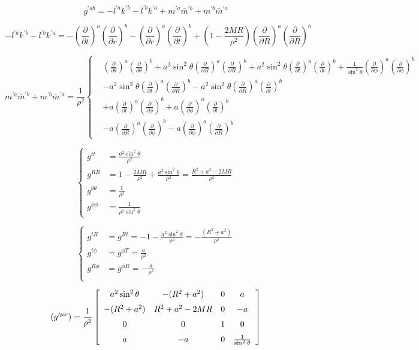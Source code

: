\documentclass{article}
\newcommand{\be}{\begin{equation}}
\newcommand{\ee}{\end{equation}}
\newcommand{\ba}{\begin{array}}
\newcommand{\ea}{\end{array}}
\newcommand{\p}{\partial}
\newcommand{\1}{\left}
\newcommand{\2}{\right}
\begin{document}
\be
g^{\prime ab}=-l^{\prime a}k^{\prime b}-l^{\prime b}k^{\prime a}+m^{\prime a}{\bar m}^{\prime b}+m^{\prime b}{\bar m}^{\prime a}
\ee

\newpage

\be 
-l^{\prime a}k^{\prime b}-l^{\prime b}k^{\prime a}
=-\1(\frac \p {\p t}\2)^a\1(\frac \p {\p r}\2)^b-\1(\frac \p {\p r}\2)^a\1(\frac \p {\p t}\2)^b+\1(1-\frac{2MR}{\rho^2}\2)\1(\frac \p {\p R}\2)^a\1(\frac \p {\p R}\2)^b
\ee

\be 
m^{\prime a}{\bar m}^{\prime b}+m^{\prime b}{\bar m}^{\prime a}=\frac{1}{\rho^2}
\1\{
\begin{split}
& \1(\frac \p {\p \theta}\2)^a\1(\frac \p {\p \theta}\2)^b+a^2\sin^2\theta\1(\frac \p {\p R}\2)^a\1(\frac \p {\p R}\2)^b+a^2\sin^2\theta\1(\frac \p {\p t}\2)^a\1(\frac \p {\p t}\2)^b+\frac{1}{\sin^2\theta}\1(\frac \p {\p \phi}\2)^a\1(\frac \p {\p \phi}\2)^b\\
&-a^2\sin^2\theta\1(\frac \p {\p t}\2)^a\1(\frac \p {\p R}\2)^b-a^2\sin^2\theta\1(\frac \p {\p R}\2)^a\1(\frac \p {\p t}\2)^b\\
&+a\1(\frac \p {\p t}\2)^a\1(\frac \p {\p \phi}\2)^b+a\1(\frac \p {\p \phi}\2)^a\1(\frac \p {\p t}\2)^b \\
&-a\1(\frac \p {\p R}\2)^a\1(\frac \p {\p \phi}\2)^b-a\1(\frac \p {\p \phi}\2)^a\1(\frac \p {\p R}\2)^b
\end{split}
\2.
\ee

\be 
\1\{
\begin{split}
g^{tt}&=\frac{a^2\sin^2\theta}{\rho^2}\\
g^{R R}&=1-\frac{2MR}{\rho^2}+\frac{a^2\sin^2\theta}{\rho^2}=\frac{R^2+a^2-2MR}{\rho^2}\\
g^{\theta\theta}&=\frac{1}{\rho^2}\\
g^{\phi\phi}&=\frac{1}{\rho^2 \sin^2\theta}
\end{split}
\2.
\ee

\be 
\1\{
\begin{split}
g^{tR}&=g^{Rt}=-1-\frac{a^2\sin^2\theta}{\rho^2}=-\frac{(R^2+a^2)}{\rho^2}\\
g^{t\phi}&=g^{\phi T}=\frac{a}{\rho^2}\\
g^{R\phi}&=g^{\phi R}=-\frac{a}{\rho^2}\\
\end{split}
\2.
\ee

\be
(g^{\prime\mu\nu})=\frac{1}{\rho^2}\left[\ba{cccc}a^2\sin^2\theta&-(R^2+a^2)&0&a\\ \noalign{\medskip}-(R^2+a^2)&R^2+a^2-2MR&0&-a\\ \noalign{\medskip}0&0&1&0\\ \noalign{\medskip}a&-a&0&\frac 1 {\sin^2\theta}\ea\right]
\ee
\end{document}
